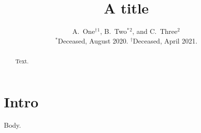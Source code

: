 \documentclass[preprint]{ptephy_v1}
\begin{document}
\title{A title}
\author{
A.~One$^{\dag}$$^{1}$,
B.~Two$^{\ast}$$^{2}$,
and
C.~Three$^{2}$
\\
{${}^{\ast}$Deceased, August 2020. }
{${}^{\dag}$Deceased, April 2021. }
}
\begin{abstract}
Text.
\end{abstract}
\maketitle
\section{Intro}
Body.
\end{document}
